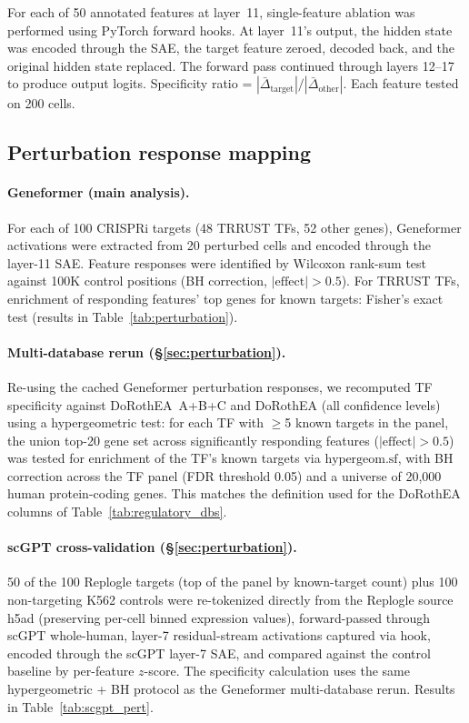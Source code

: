 \documentclass[onecolumn]{article}
\begin{document}
For each of 50 annotated features at layer~11, single-feature ablation was performed using PyTorch forward hooks. At layer~11's output, the hidden state was encoded through the SAE, the target feature zeroed, decoded back, and the original hidden state replaced. The forward pass continued through layers 12--17 to produce output logits. Specificity ratio = $|\bar{\Delta}_\text{target}| / |\bar{\Delta}_\text{other}|$. Each feature tested on 200 cells.

\subsection{Perturbation response mapping}

\paragraph{Geneformer (main analysis).} For each of 100 CRISPRi targets (48 TRRUST TFs, 52 other genes), Geneformer activations were extracted from 20 perturbed cells and encoded through the layer-11 SAE. Feature responses were identified by Wilcoxon rank-sum test against 100K control positions (BH correction, $|\text{effect}| > 0.5$). For TRRUST TFs, enrichment of responding features' top genes for known targets: Fisher's exact test (results in Table~\ref{tab:perturbation}).

\paragraph{Multi-database rerun (\S\ref{sec:perturbation}).} Re-using the cached Geneformer perturbation responses, we recomputed TF specificity against DoRothEA~A+B+C and DoRothEA (all confidence levels) using a hypergeometric test: for each TF with $\geq$5 known targets in the panel, the union top-20 gene set across significantly responding features ($|\text{effect}|>0.5$) was tested for enrichment of the TF's known targets via $\text{hypergeom.sf}$, with BH correction across the TF panel (FDR threshold 0.05) and a universe of 20{,}000 human protein-coding genes. This matches the definition used for the DoRothEA columns of Table~\ref{tab:regulatory_dbs}.

\paragraph{scGPT cross-validation (\S\ref{sec:perturbation}).} 50 of the 100 Replogle targets (top of the panel by known-target count) plus 100 non-targeting K562 controls were re-tokenized directly from the Replogle source h5ad (preserving per-cell binned expression values), forward-passed through scGPT whole-human, layer-7 residual-stream activations captured via hook, encoded through the scGPT layer-7 SAE, and compared against the control baseline by per-feature $z$-score. The specificity calculation uses the same hypergeometric + BH protocol as the Geneformer multi-database rerun. Results in Table~\ref{tab:scgpt_pert}.
\end{document}
